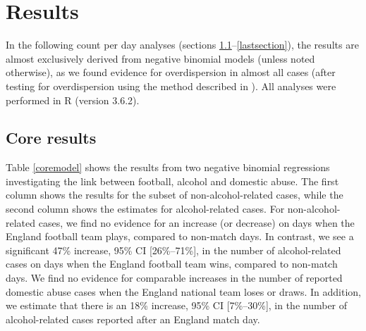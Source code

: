 \documentclass[12pt, a4paper]{article}
\begin{document}
\newpage

\section{Results}

In the following count per day analyses (sections \ref{firstsection}--\ref{lastsection}), the results are almost exclusively derived from negative binomial models (unless noted otherwise), as we found evidence for overdispersion in almost all cases (after testing for overdispersion using the method described in ). All analyses were performed in R (version 3.6.2).


\subsection{Core results} \label{firstsection}

Table \ref{coremodel} shows the results from two negative binomial regressions investigating the link between football, alcohol and domestic abuse. The first column shows the results for the subset of non-alcohol-related cases, while the second column shows the estimates for alcohol-related cases. For non-alcohol-related cases, we find no evidence for an increase (or decrease) on days when the England football team plays, compared to non-match days. In contrast, we see a significant 47\% increase, 95\% CI [26\%--71\%], in the number of alcohol-related cases on days when the England football team wins, compared to non-match days. We find no evidence for comparable increases in the number of reported domestic abuse cases when the England national team loses or draws. In addition, we estimate that there is an 18\% increase, 95\% CI [7\%--30\%], in the number of alcohol-related cases reported after an England match day. 
\end{document}
